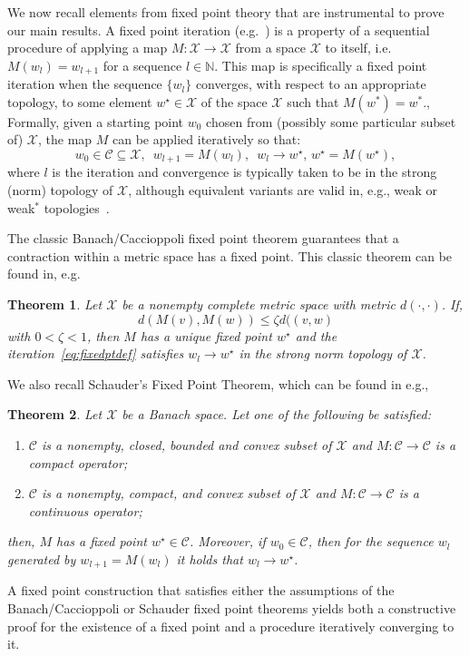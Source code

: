 \documentclass[a4paper,fleqn]{cas-sc}
\newtheorem{theorem}{Theorem}[section]
\begin{document}
We now recall elements from fixed point theory that are instrumental to prove our main results. A fixed point iteration (e.g.~\cite{zeidler1986nonlinear}) is a property of a sequential procedure of applying a map $M:\mathcal{X}\to\mathcal{X}$ from a space $\mathcal{X}$ to itself, i.e. $M(w_l)=w_{l+1}$ for a sequence $l\in\mathbb{N}$. This map is specifically a fixed point iteration when the sequence $\{w_l\}$ converges, with respect to an appropriate topology, to some element $w^\star\in\mathcal{X}$ of the space $\mathcal{X}$ such that $M(w^*)=w^*$., Formally, given a starting point $w_0$ chosen from (possibly some particular subset of) $\mathcal{X}$, the map $M$ can be applied iteratively so that:
\begin{equation}\label{eq:fixedptdef}
w_0\in\mathcal{C}\subseteq\mathcal{X},\,\,\,
w_{l+1}=M(w_l),\,\,\,
w_l\to w^\star,\,w^\star=M(w^\star),
\end{equation}
where $l$ is the iteration and convergence is typically taken to be in the strong (norm) topology of $\mathcal{X}$, although equivalent variants are valid in, e.g., weak or weak$^*$ topologies~\cite{buttazzo2014variational}.

The classic Banach/Caccioppoli fixed point theorem guarantees that a contraction within a metric space has a fixed point. This classic theorem can be found in, e.g.~\cite[Theorem 1.A]{zeidler1986nonlinear}
\begin{theorem}\label{th:banachfp}
Let $\mathcal{X}$ be a nonempty complete metric space with metric $d(\cdot,\cdot)$. If,
\begin{equation}\label{eq:contract}
    d\left(M(v),M(w)\right)\le \zeta d(\left(v,w\right)
\end{equation}
    with $0<\zeta<1$, then $M$ has a unique fixed point $w^\star$ and the iteration~\eqref{eq:fixedptdef} satisfies $w_{l}\to w^\star$ in the strong norm topology of $\mathcal{X}$.
\end{theorem}

We also recall Schauder's Fixed Point Theorem, which can be found in e.g.,~\cite[Theorem 2.A and Corollary 2.13]{zeidler1986nonlinear}
\begin{theorem}\label{th:schauder}
Let $\mathcal{X}$ be a Banach space. Let one of the following be satisfied:
\begin{enumerate}
    \item  $\mathcal{C}$ is a nonempty, closed, bounded and convex subset of $\mathcal{X}$ and  $M:\mathcal{C}\to \mathcal{C}$ is a compact operator;
    \item  $\mathcal{C}$ is a nonempty, compact,  and convex subset of $\mathcal{X}$ and  $M:\mathcal{C}\to \mathcal{C}$ is a continuous operator;
\end{enumerate}
then, $M$ has a fixed point $w^\star\in\mathcal{C}$. Moreover, if $w_0\in\mathcal{C}$, then for the sequence $w_l$  generated by  $w_{l+1}=M(w_l)$ it holds that $w_l\to w^\star$.\end{theorem}
A fixed point construction that satisfies either the assumptions of the Banach/Caccioppoli or Schauder fixed point theorems yields both a constructive proof for the existence of a fixed point and a procedure iteratively converging to it. 
\end{document}
